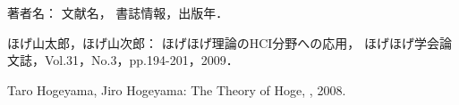 
\begin{bib}[100]

\begin{thebibliography}{}

    著者名： 
    \newblock 文献名，
    \newblock 書誌情報，出版年．

   ほげ山太郎，ほげ山次郎：
   \newblock ほげほげ理論のHCI分野への応用，
   \newblock ほげほげ学会論文誌，Vol.31，No.3，pp.194-201，2009．
 
   Taro Hogeyama, Jiro Hogeyama:
   \newblock The Theory of Hoge,
   , 2008.
	
\end{thebibliography}

\end{bib}
